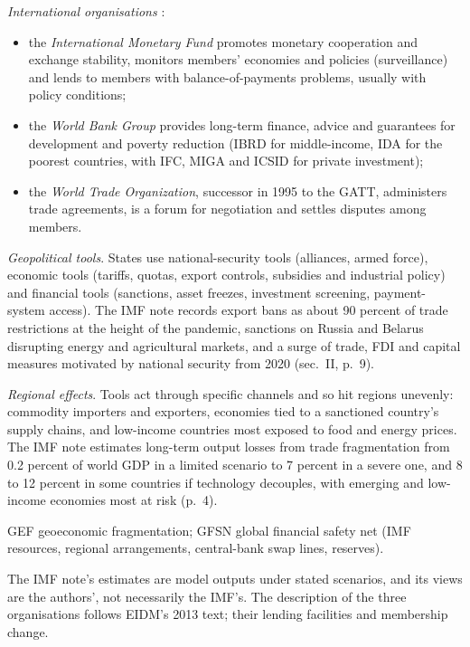 \begin{qfdefinition}
\emph{International organisations} \citep[chap.~8, sec.~5, pp.~451--456]{economics-investment-decision-makers-2013}:
\begin{itemize}
\item the \emph{International Monetary Fund} promotes monetary cooperation and exchange stability, monitors members' economies and policies (surveillance) and lends to members with balance-of-payments problems, usually with policy conditions;
\item the \emph{World Bank Group} provides long-term finance, advice and guarantees for development and poverty reduction (IBRD for middle-income, IDA for the poorest countries, with IFC, MIGA and ICSID for private investment);
\item the \emph{World Trade Organization}, successor in 1995 to the GATT, administers trade agreements, is a forum for negotiation and settles disputes among members.
\end{itemize}

\emph{Geopolitical tools}. States use national-security tools (alliances, armed force), economic tools (tariffs, quotas, export controls, subsidies and industrial policy) and financial tools (sanctions, asset freezes, investment screening, payment-system access). The IMF note records export bans as about 90 percent of trade restrictions at the height of the pandemic, sanctions on Russia and Belarus disrupting energy and agricultural markets, and a surge of trade, FDI and capital measures motivated by national security from 2020 (sec.~II, p.~9).

\emph{Regional effects}. Tools act through specific channels and so hit regions unevenly: commodity importers and exporters, economies tied to a sanctioned country's supply chains, and low-income countries most exposed to food and energy prices. The IMF note estimates long-term output losses from trade fragmentation from 0.2 percent of world GDP in a limited scenario to 7 percent in a severe one, and 8 to 12 percent in some countries if technology decouples, with emerging and low-income economies most at risk (p.~4).

 GEF geoeconomic fragmentation; GFSN global financial safety net (IMF resources, regional arrangements, central-bank swap lines, reserves).

 The IMF note's estimates are model outputs under stated scenarios, and its views are the authors', not necessarily the IMF's. The description of the three organisations follows EIDM's 2013 text; their lending facilities and membership change.


\end{qfdefinition}
